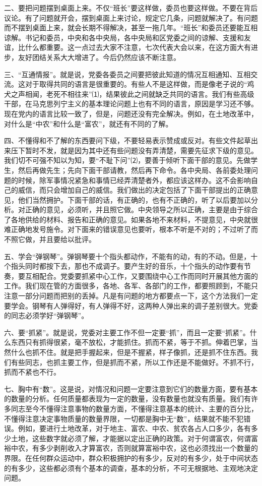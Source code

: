 \documentclass[UTF-8, a5paper, 12pt]{ctexart}
\begin{document}
二、要把问题摆到桌面上来。不仅“班长”要这样做，委员也要这样做。不要在背后议论。有了问题就开会，摆到桌面上来讨论，规定它几条，问题就解决了。有问题而不摆到桌面上来，就会长期不得解决，甚至一拖几年。“班长”和委员还要能互相谅解。书记和委员，中央和各中央局，各中央局和区党委之间的谅解、支援和友谊，比什么都重要。这一点过去大家不注意，七次代表大会以来，在这方面大有进步，友好团结关系大大增进了。今后仍然应该不断注意。

三、“互通情报”。就是说，党委各委员之间要把彼此知道的情况互相通知、互相交流。这对于取得共同的语言是很重要的。有些人不是这样做，而是像老子说的“鸡犬之声相闻，老死不相往来”⑴，结果彼此之间就缺乏共同的语言。我们有些高级干部，在马克思列宁主义的基本理论问题上也有不同的语言，原因是学习还不够。现在党内的语言比较一致了，但是，问题还没有完全解决。例如，在土地改革中，对什么是“中农”和什么是“富农”，就还有不同的了解。

四、不懂得和不了解的东西要问下级，不要轻易表示赞成或反对。有些文件起草出来压下暂时不发，就是因为其中还有些问题没有弄清楚，需要先征求下级的意见。我们切不可强不知以为知，要“不耻下问”⑵，要善于倾听下面干部的意见。先做学生，然后再做先生；先向下面干部请教，然后再下命令。各中央局、各前委处理问题的时候，除军事情况紧急和事情已经弄清楚者外，都应该这样办。这不会影响自己的威信，而只会增加自己的威信。我们做出的决定包括了下面干部提出的正确意见，他们当然拥护。下面干部的话，有正确的，也有不正确的，听了以后要加以分析。对正确的意见，必须听，并且照它做。中央领导之所以正确，主要是由于综合了各地供给的材料、报告和正确的意见。如果各地不来材料，不提意见，中央就很难正确地发号施令。对下面来的错误意见也要听，根本不听是不对的；不过听了而不照它做，并且要给以批评。

五、学会“弹钢琴”。弹钢琴要十个指头都动作，不能有的动，有的不动。但是，十个指头同时都按下去，那也不成调子。要产生好的音乐，十个指头的动作要有节奏，要互相配合。党委要抓紧中心工作，又要围绕中心工作而同时开展其他方面的工作。我们现在管的方面很多，各地、各军、各部门的工作，都要照顾到，不能只注意一部分问题而把别的丢掉。凡是有问题的地方都要点一下，这个方法我们一定要学会。钢琴有人弹得好，有人弹得不好，这两种人弹出来的调子差别很大。党委的同志必须学好“弹钢琴”。

六、要“抓紧”。就是说，党委对主要工作不但一定要“抓”，而且一定要“抓紧”。什么东西只有抓得很紧，毫不放松，才能抓住。抓而不紧，等于不抓。伸着巴掌，当然什么也抓不住。就是把手握起来，但是不握紧，样子像抓，还是抓不住东西。我们有些同志，也抓主要工作，但是抓而不紧，所以工作还是不能做好。不抓不行，抓而不紧也不行。

七、胸中有“数”。这是说，对情况和问题一定要注意到它们的数量方面，要有基本的数量的分析。任何质量都表现为一定的数量，没有数量也就没有质量。我们有许多同志至今不懂得注意事物的数量方面，不懂得注意基本的统计、主要的百分比，不懂得注意决定事物质量的数量界限，一切都是胸中无“数”，结果就不能不犯错误。例如，要进行土地改革，对于地主、富农、中农、贫农各占人口多少，各有多少土地，这些数字就必须了解，才能据以定出正确的政策。对于何谓富农，何谓富裕中农，有多少剥削收入才算富农，否则就算富裕中农，这也必须找出一个数量的界限。在任何群众运动中，群众积极拥护的有多少，反对的有多少，处于中间状态的有多少，这些都必须有个基本的调查，基本的分析，不可无根据地、主观地决定问题。
\end{document}
